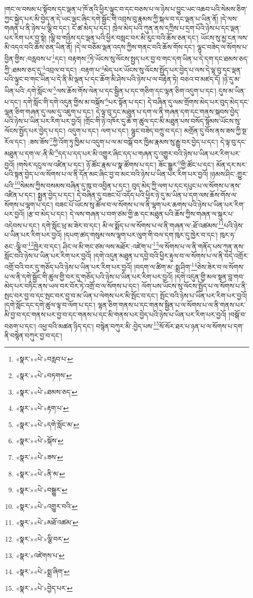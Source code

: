 །གང་ལ་བསམ་པ་སྟོབས་དང་ལྡན་པ་ཁོ་ནའི་ཕྱིར་ལྟུང་བ་དང་བཅས་པ་ལ་ཉེས་པ་བྱུང་ཡང་འཆབ་པའི་སེམས་ཅིག་ཀྱང་སྐྱེད་པར་མི་བྱེད་ན་དེ་ཡང་ལྡང་ཞིང་དགེ་སྦྱོང་གི་འབྲས་བུ་རྣམས་ཀྱི་སྐལ་བ་དང་ལྡན་པ་ཡིན་ནོ། །དེ་ལས་གཞན་པ་ནི་ཉེས་པ་ལྕི་བ་དང་། ངོ་ཚ་མེད་པ་དང་། ཁྲེལ་མེད་པའི་ཀུན་ནས་དཀྲིས་པ་དྲག་པོའི་ཉེས་པ་དང་ལྡན་པར་རིག་པར་བྱ་སྟེ། །ལྕི་བ་གཉིས་དང་ལྡན་པའི་ཕྱིར་བསླང་བར་མི་རུང་བའི་ཆོས་ཅན་དང་། ཡོངས་སུ་མྱ་ངན་ལས་མི་འདའ་བའི་ཆོས་ཅན་ཡིན་ནོ། །དེ་ལ་བཅོམ་ལྡན་འདས་ཀྱིས་གནང་བའི་ཆོས་གོས་དང་། ལྷུང་བཟེད་ལ་སོགས་པ་བྱིན་གྱིས་:བརླབས་པ་\footnote{«སྣར་»«པེ་»བརླབ་པ་}དང་། བརྟགས་\footnote{«སྣར་»«པེ་»བཏགས་}ཏེ་ཡོངས་སུ་ལོངས་སྤྱད་པར་བྱ་བ་གང་དག་ཡིན་པ་དེ་དག་དང་ཐམས་ཅད་ཀྱི་:ཐམས་ཅད་དུ་\footnote{«སྣར་»«པེ་»ཐམས་ཅད་}འབྲལ་བ་དང་། :བརྟག་པ་\footnote{«སྣར་»«པེ་»རྟག་པ་}མེད་པར་ཡོངས་སུ་ལོངས་སྤྱོད་པར་བྱེད་པ་ལས་དེ་ལྟ་བུ་དང་ལྡན་པའི་ལྟུང་བ་གང་ཡིན་པ་དེ་ནི་མི་ལྡན་པ་དང་ཆོག་མི་ཤེས་པའི་ཉེས་པ་ལ་བརྟེན་ཏེ། བཅའ་བ་མཛད་དོ། །ཉེ་དུ་མ་ཡིན་པའི་:དགེ་སློང་ལ་\footnote{«སྣར་»«པེ་»དགེ་སློང་མ་}ལས་ཆོས་གོས་ལེན་པ་དང་སྦྱིན་པ་དང་གཅིག་དང་ལྷན་ཅིག་འདུག་པ་དང་། དུས་མ་ཡིན་པ་དང་། དགེ་སློང་གི་དགེ་འདུན་གྱིས་མ་བསྐོས་\footnote{«སྣར་»«པེ་»སྐོས་}པར་སྟོན་པ་དང་། དེ་བཞིན་དུ་ལམ་གྲོགས་མེད་པར་བུད་མེད་དང་ལྷན་ཅིག་གཞན་དུ་ལམ་དུ་འཇུག་པ་དང་། དེ་ལྟ་བུ་དང་མཐུན་པ་དག་ལ་ནི་གཞན་དག་དང་གནས་སྐབས་བྱེད་པའི་ཉེས་པ་ཡིན་པར་རིག་པར་བྱའོ། །གྲོང་གི་ཉེ་འཁོར་དུ་ཆོ་ག་ཚུལ་དང་མི་མཐུན་པས་བསོད་སྙོམས་ཡོངས་སུ་ལོངས་སྤྱོད་པར་བྱེད་པ་དང་། འདུག་པ་དང་། ལག་པ་དང་། ལྷུང་བཟེད་བཀྲུ་བ་དང་། མགྲོན་དུ་བོས་ནས་ཟས་ཀྱི་སྔ་རོལ་དང་། :ཟས་ཟོས་\footnote{«སྣར་»«པེ་»ཟས་}ཀྱི་འོག་ཏུ་ཁྱིམ་པ་འདུག་པ་ལ་མ་བསྒོ་བར་ཁྱིམ་རྣམས་སུ་རྒྱུ་བར་བྱེད་པ་དང་། དེ་ལྟ་བུ་དང་མཐུན་པ་དག་ལ་:ནི་མི་\footnote{«སྣར་»«པེ་»ནི་མ་}དད་པ་དད་པར་མི་འགྱུར་ཞིང་དད་པ་གཞན་དུ་འགྱུར་བའི་ཉེས་པ་ཡིན་པར་རིག་པར་བྱའོ། །གསེར་དངུལ་ལ་འཛིན་པ་དང་། ཉོ་ཚོང་རྣམ་པ་སྣ་ཚོགས་པ་དང་། ཟོང་སྒྱུར་\footnote{«སྣར་»«པེ་»བསྒྱུར་}གྱི་ཚོང་པ་དང་། མོན་དར་སར་པའི་སྟན་བྱེད་པ་ལ་སོགས་པ་ལ་ནི་དོན་མང་ཞིང་བྱ་བ་མང་བའི་ཉེས་པ་ཡིན་པར་རིག་པར་བྱའོ། །ཉམས་ཤིང་:གྱུར་པའི་\footnote{«སྣར་»«པེ་»འགྱུར་བའི་}སེམས་ཀྱིས་བསམས་བཞིན་དུ་ཁུ་བ་འབྱིན་པ་དང་། བུད་མེད་ཀྱི་ལག་པ་དང་དཔུང་པ་ལ་སོགས་པ་ནས་འཛིན་པ་དང་། སྨྱན་བྱེད་པ་དང་། དེ་བཞིན་དུ་བཟང་པོ་འདོད་པའི་ཕྱིར་ཉེ་དུ་མ་ཡིན་པ་དག་ལས་ཆོས་གོས་ལ་སོགས་པ་ལྷག་པ་དང་། བཟང་པོ་ཡོངས་སུ་ཚོལ་བ་ལ་སོགས་པ་ལ་ནི་ལྷག་པར་ཆགས་པའི་ཉེས་པ་ཡིན་པར་རིག་པར་བྱའོ། །རྩ་བ་མེད་པ་དང་། དེ་ལས་གཞན་པ་བག་ཙམ་གྱི་ཆ་དང་མཐུན་པའི་ཆོས་ཀྱིས་གཞན་ལ་སྐུར་པ་འདེབས་པ་དང་། དགེ་སློང་ཕྲ་མ་ཟེར་བ་དང་། མི་ལ་སྨོད་པ་ལ་སོགས་པ་ལ་ནི་གཞན་ལ་:ཐོ་འཚམས་\footnote{«སྣར་»«པེ་»མཐོ་འཚམ་}པའི་ཉེས་པ་ཡིན་པར་རིག་པར་བྱའོ། །དཔག་ཚད་གསུམ་ལས་ལྷག་པར་ལུག་གི་བལ་དག་ཁུར་དུ་ཁྱེར་བ་དང་། ཁུར་ཧ་ཅང་:ལྕི་བ་\footnote{«སྣར་»«པེ་»ལྕི་བར་}ཁྱེར་བ་དང་། ཤིང་ལ་མི་གང་ཙམ་ལས་མཐོར་:འཛེག་པ་\footnote{«སྣར་»འཛེགས་པ་}ལ་སོགས་པ་ལ་ནི་གནོད་པས་ཀུན་ནས་སློང་བའི་ཉེས་པ་ཡིན་པར་རིག་པར་བྱའོ། །དགེ་འདུན་མཐུན་པ་དབྱེ་བའི་ཕྱིར་རྟུལ་བ་ལ་སོགས་པ་ལ་ནི་བདེ་འགྲོར་འགྲོ་བའི་བར་དུ་གཅོད་པའི་ཉེས་པ་ཡིན་པར་རིག་པར་བྱའོ། །བདག་ལ་ཚིག་མ་:སྨྲ་ཤིག་\footnote{«སྣར་»«པེ་»སྨྲ་ཞིག་}ཅེས་ཟེར་བ་ལ་སོགས་པ་ལ་ནི་དགེ་སྦྱོང་གི་ཚུལ་གྱི་བར་དུ་གཅོད་པའི་ཉེས་པ་ཡིན་པར་རིག་པར་བྱའོ། །དགེ་འདུན་གྱི་མལ་སྟན་བླ་གབ་མེད་པར་བཏིང་ནས་ཡལ་བར་བོར་ཏེ་འགྲོ་བ་ལ་སོགས་པ་དང་། ལོག་པས་ཡོངས་སུ་ལོངས་སྤྱོད་པ་ལ་སོགས་པ་ནི་སྤང་བར་བྱ་བ་དང་སྤང་བར་བྱ་བ་མ་ཡིན་པ་ལེགས་པར་མི་སྤོང་བ་དང་། སྤོང་བའི་ཉེས་པ་ཡིན་པར་རིག་པར་བྱའོ། །དགེ་སློང་དང་དགེ་ཚུལ་ལྟ་བ་ལོག་པ་དང་། ལྷན་ཅིག་གནས་པ་དང་གནས་སྦྱིན་པ་ལ་སོགས་པ་ལ་ནི་གནས་པར་མི་བྱ་བ་དང་གནས་པར་བྱ་བ་དང་གནས་པ་དང་མི་གནས་པར་བྱེད་པའི་ཉེས་པ་ཡིན་པར་རིག་པར་བྱའོ། །བསྒོ་བ་བཅག་པ་དང་། འཕྱ་བའི་མཚན་ཉིད་དང་། བསྙེན་བཀུར་མི་:བྱེད་པས་\footnote{«སྣར་»«པེ་»བྱེད་པར་}སོ་སོར་ཐར་པ་ཉན་པ་ལ་སོགས་པ་དག་ནི་བསྙེན་བཀུར་བྱ་བ་དང་། 
